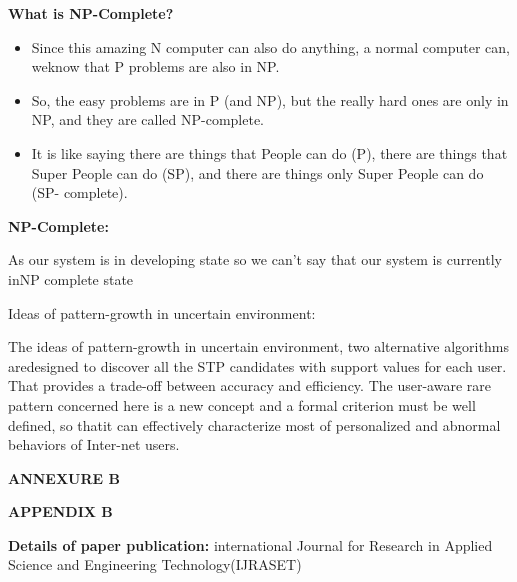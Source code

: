 \documentclass[12pt]{report}
\begin{document}
\vspace{1cm}

\textbf{What is NP-Complete?
}
\begin{itemize}
\item Since this amazing N computer can also do anything, a normal computer can, weknow 
that P problems are also in NP.
\item So, the easy problems are in P (and NP), but the really hard ones are only in
NP, and they are called NP-complete.
\item It is like saying there are things that People can do (P), there are things that Super 
People can do (SP), and there are things only Super People can do (SP- complete).
\end{itemize}
\textbf{NP-Complete:}

As our system is in developing state so we can’t say that our system is currently inNP
complete state

Ideas of pattern-growth in uncertain environment:

The ideas of pattern-growth in uncertain environment, two alternative algorithms aredesigned to 
discover all the STP candidates with support values for each user. That provides a trade-off 
between accuracy and efficiency. The user-aware rare pattern concerned here is a new concept 
and a formal criterion must be well defined, so thatit can effectively characterize most of
personalized and abnormal behaviors of Inter-net users.



\vspace{1cm}




\centering
\Large\textbf{ANNEXURE B}

\centering

\Large\textbf{APPENDIX B}\\
\justifying
\setlength{\parindent}{4em}
\setlength{\parskip}{0.5em}
\renewcommand{\baselinestretch}{1.5}
\normalsize
\raggedright\textbf{Details of paper publication:} international Journal for Research in Applied Science and Engineering Technology(IJRASET)

\vspace{1cm}


\vspace{0.1cm} 






\vspace{15 cm}
\end{document}
